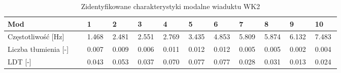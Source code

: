 \begin{table}[hbt!]
	\caption{Zidentyfikowane charakterystyki modalne wiaduktu WK2}
	\label{tab: wk2_ident_mods}
	\footnotesize
	\setlength\tabcolsep{0pt}
	\begin{tabular}{@{} p{0.22\linewidth}  *{10}{P{0.078\linewidth}} @{}}
	\toprule
	Mod  & 1 & 2 & 3 & 4 & 5 & 6 & 7 & 8 & 9 & 10 \\ \midrule
	Częstotliwość {[}Hz{]}   & 1.468          & 2.481          & 2.551          & 2.769          & 3.435          & 4.853          & 5.809          & 5.874          & 6.132          & 7.483           \\ \midrule
	Liczba tłumienia {[}-{]} & 0.007          & 0.009          & 0.006          & 0.011          & 0.012          & 0.012          & 0.005          & 0.005          & 0.002          & 0.004           \\ \midrule
	LDT {[}-{]}              & 0.043          & 0.053          & 0.037          & 0.070          & 0.077          & 0.077          & 0.028          & 0.031          & 0.013          & 0.024           \\ \bottomrule
\end{tabular}
\end{table}





